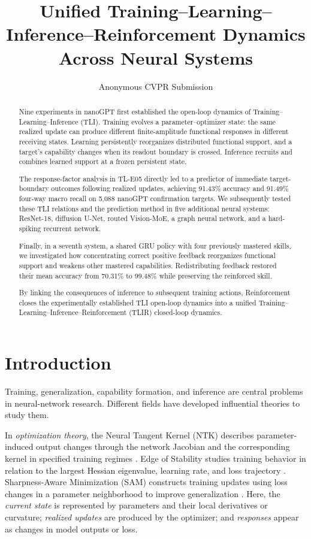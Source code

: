 \documentclass[10pt,twocolumn,letterpaper]{article}
\title{Unified Training--Learning--Inference--Reinforcement Dynamics Across Neural Systems}
\author{Anonymous CVPR Submission}
\begin{document}
\maketitle
\begin{abstract}
Nine experiments in nanoGPT first established the open-loop dynamics of Training--Learning--Inference (TLI). Training evolves a parameter--optimizer state: the same realized update can produce different finite-amplitude functional responses in different receiving states. Learning persistently reorganizes distributed functional support, and a target's capability changes when its readout boundary is crossed. Inference recruits and combines learned support at a frozen persistent state.

The response-factor analysis in TL-E05 directly led to a predictor of immediate target-boundary outcomes following realized updates, achieving 91.43\% accuracy and 91.49\% four-way macro recall on 5,088 nanoGPT confirmation targets. We subsequently tested these TLI relations and the prediction method in five additional neural systems: ResNet-18, diffusion U-Net, routed Vision-MoE, a graph neural network, and a hard-spiking recurrent network.

Finally, in a seventh system, a shared GRU policy with four previously mastered skills, we investigated how concentrating correct positive feedback reorganizes functional support and weakens other mastered capabilities. Redistributing feedback restored their mean accuracy from 70.31\% to 99.48\% while preserving the reinforced skill.

By linking the consequences of inference to subsequent training actions, Reinforcement closes the experimentally established TLI open-loop dynamics into a unified Training--Learning--Inference--Reinforcement (TLIR) closed-loop dynamics.
\end{abstract}

\section{Introduction}
Training, generalization, capability formation, and inference are central problems in neural-network research. Different fields have developed influential theories to study them.

In \emph{optimization theory}, the Neural Tangent Kernel (NTK) describes parameter-induced output changes through the network Jacobian and the corresponding kernel in specified training regimes \cite{jacot2018}. Edge of Stability studies training behavior in relation to the largest Hessian eigenvalue, learning rate, and loss trajectory \cite{cohen2021}. Sharpness-Aware Minimization (SAM) constructs training updates using loss changes in a parameter neighborhood to improve generalization \cite{foret2021}. Here, the \emph{current state} is represented by parameters and their local derivatives or curvature; \emph{realized updates} are produced by the optimizer; and \emph{responses} appear as changes in model outputs or loss.
\end{document}

